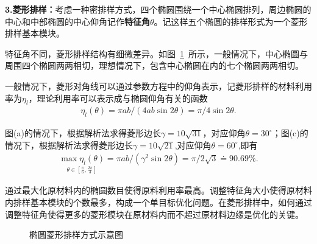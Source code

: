 \documentclass{whutmod}
\begin{document}
			
			\textbf{3.菱形排样：}考虑一种密排样方式，四个椭圆围绕一个中心椭圆排列，周边椭圆的中心和中部椭圆的中心仰角记作\textbf{特征角}$\theta$。记这样五个椭圆的排样形式为一个菱形排样基本模块。
			
			特征角不同，菱形排样结构有细微差异。如图~\ref{cdcc}~所示，一般情况下，中心椭圆与周围四个椭圆两两相切，理想情况下，包含中心椭圆在内的七个椭圆两两相切。
			
			一般情况下，菱形对角线可以通过参数方程中的仰角表示，记菱形排样的材料利用率为$\eta_l$，理论利用率可以表示成与椭圆仰角有关的函数
			\begin{gather*}
			\eta_l(\theta)=\pi ab/\left (4ab\sin 2\theta\right )=\pi /4\sin 2\theta.
			\end{gather*}
			
			图(a)的情况下，根据解析法求得菱形边长$\gamma =10\sqrt{31}$，对应仰角$\theta=30^{\circ}$；图(c)的情况下，根据解析法求得菱形边长$\gamma =10\sqrt{21}$,对应仰角$\theta=60^{\circ}$,即有
			\begin{gather}
			\underset{\theta \in [\frac{\pi}{6},\frac{2\pi}{3}]}{\max \eta_l(\theta)}=\pi ab/\left (\gamma ^2\sin 2\theta\right )=\pi/2\sqrt{3}\doteq 90.69\%.
			\end{gather}

			通过最大化原材料内的椭圆数目使得原料利用率最高。调整特征角大小使得原材料内排样基本模块的个数最多，构成一个单目标优化问题。在菱形排样中，如何通过调整特征角使得更多的菱形模块在原材料内而不超过原材料边缘是优化的关键。
						\begin{figure}[H]
				\centering
				\hfill
				\hfill

				\caption{椭圆菱形排样方式示意图}\label{cdcc}
			\end{figure}
\end{document}
